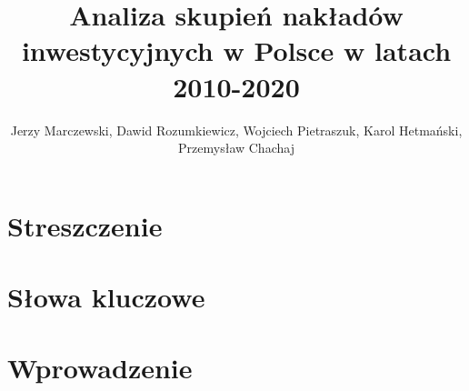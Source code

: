 \documentclass{article}
\title{Analiza skupień nakładów inwestycyjnych w Polsce w latach 2010-2020}
\author{Jerzy Marczewski, Dawid Rozumkiewicz, Wojciech Pietraszuk, Karol Hetmański, Przemysław Chachaj}
\date{}
\begin{document}
\maketitle

\section{Streszczenie}

\section{Słowa kluczowe}

\section{Wprowadzenie}
\end{document}
